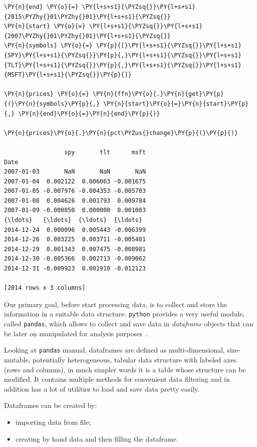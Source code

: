 \begin{tcolorbox}[breakable, size=fbox, boxrule=1pt, pad at break*=1mm,colback=cellbackground, colframe=cellborder]
\begin{Verbatim}[commandchars=\\\{\}]
\PY{n}{end} \PY{o}{=} \PY{l+s+s1}{\PYZsq{}}\PY{l+s+s1}{2015\PYZhy{}01\PYZhy{}01}\PY{l+s+s1}{\PYZsq{}}
\PY{n}{start} \PY{o}{=} \PY{l+s+s1}{\PYZsq{}}\PY{l+s+s1}{2007\PYZhy{}01\PYZhy{}01}\PY{l+s+s1}{\PYZsq{}}
\PY{n}{symbols} \PY{o}{=} \PY{p}{[}\PY{l+s+s1}{\PYZsq{}}\PY{l+s+s1}{SPY}\PY{l+s+s1}{\PYZsq{}}\PY{p}{,}\PY{l+s+s1}{\PYZsq{}}\PY{l+s+s1}{TLT}\PY{l+s+s1}{\PYZsq{}}\PY{p}{,}\PY{l+s+s1}{\PYZsq{}}\PY{l+s+s1}{MSFT}\PY{l+s+s1}{\PYZsq{}}\PY{p}{]}

\PY{n}{prices} \PY{o}{=} \PY{n}{ffn}\PY{o}{.}\PY{n}{get}\PY{p}{(}\PY{n}{symbols}\PY{p}{,} \PY{n}{start}\PY{o}{=}\PY{n}{start}\PY{p}{,} \PY{n}{end}\PY{o}{=}\PY{n}{end}\PY{p}{)}

\PY{n}{prices}\PY{o}{.}\PY{n}{pct\PYZus{}change}\PY{p}{(}\PY{p}{)}

                 spy       tlt      msft
Date
2007-01-03       NaN       NaN       NaN
2007-01-04  0.002122  0.006063 -0.001675
2007-01-05 -0.007976 -0.004353 -0.005703
2007-01-08  0.004626  0.001793  0.009784
2007-01-09 -0.000850  0.000000  0.001003
{\ldots}   {\ldots}  {\ldots}  {\ldots}
2014-12-24  0.000096  0.005443 -0.006399
2014-12-26  0.003225  0.003711 -0.005401
2014-12-29  0.001343  0.007475 -0.008981
2014-12-30 -0.005366  0.002713 -0.009062
2014-12-31 -0.009923  0.001910 -0.012123
	
[2014 rows x 3 columns]
\end{Verbatim}
\end{tcolorbox}

Our primary goal, before start processing data, is to collect and store the information in a suitable data structure. \texttt{python} provides a very useful module, called \texttt{pandas}, which allows to collect and save data in \emph{dataframe} objects that can be later on manipulated for analysis purposes~\cite{pandas}.

Looking at \texttt{pandas} manual, dataframes are defined as multi-dimensional, size-mutable, potentially heterogeneous, tabular data structure with labeled axes (rows and columns), in much simpler words it is a table whose structure can be modified.
It contains multiple methods for convenient data filtering and in addition has a lot of utilities to load and 
save data pretty easily.

Dataframes can be created by:
\begin{itemize}
	\tightlist
\item importing data from file;
\item creating by hand data and then filling the dataframe.
\end{itemize}

